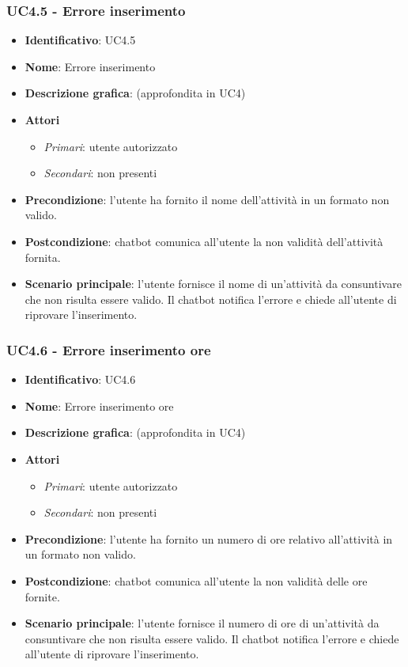 \subsubsection{UC4.5 - Errore inserimento }
\begin{itemize}
    \item \textbf{Identificativo}: UC4.5
    \item \textbf{Nome}: Errore inserimento 
    \item \textbf{Descrizione grafica}: (approfondita in UC4)
    \item \textbf{Attori}
        \begin{itemize} 
            \item \textit{Primari}: utente autorizzato
            \item \textit{Secondari}: non presenti
        \end{itemize}
    \item \textbf{Precondizione}: l'utente ha fornito il nome dell'attività in un formato non valido. 
    \item \textbf{Postcondizione}: chatbot comunica all'utente la non validità dell'attività fornita.
    \item \textbf{Scenario principale}: l'utente fornisce il nome di un'attività da consuntivare che non risulta essere valido. Il chatbot notifica l'errore e chiede all'utente di riprovare l'inserimento. 
\end{itemize}

\subsubsection{UC4.6 - Errore inserimento ore}
\begin{itemize}
    \item \textbf{Identificativo}: UC4.6
    \item \textbf{Nome}: Errore inserimento ore
    \item \textbf{Descrizione grafica}: (approfondita in UC4)
    \item \textbf{Attori}
        \begin{itemize} 
            \item \textit{Primari}: utente autorizzato
            \item \textit{Secondari}: non presenti
        \end{itemize}
    \item \textbf{Precondizione}: l'utente ha fornito un numero di ore relativo all'attività in un formato non valido. 
    \item \textbf{Postcondizione}: chatbot comunica all'utente la non validità delle ore fornite.
    \item \textbf{Scenario principale}: l'utente fornisce il numero di ore di un'attività da consuntivare che non risulta essere valido. Il chatbot notifica l'errore e chiede all'utente di riprovare l'inserimento. 
\end{itemize}
\newpage

